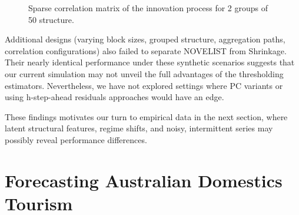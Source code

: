 \documentclass[
  11pt,
  letterpaper,
  DIV=11,
  numbers=noendperiod,
  titlepage]{scrartcl}
\begin{document}
\begin{figure}


\caption{\label{fig-Sigma-2x50}Sparse correlation matrix of the
innovation process for 2 groups of 50 structure.}

\end{figure}%

Additional designs (varying block sizes, grouped structure, aggregation
paths, correlation configurations) also failed to separate NOVELIST from
Shrinkage. Their nearly identical performance under these synthetic
scenarios suggests that our current simulation may not unveil the full
advantages of the thresholding estimators. Nevertheless, we have not
explored settings where PC variants or using h-step-ahead residuals
approaches would have an edge.

These findings motivates our turn to empirical data in the next section,
where latent structural features, regime shifts, and noisy, intermittent
series may possibly reveal performance differences.

\section{Forecasting Australian Domestics Tourism}\label{sec-empirical}
\end{document}
